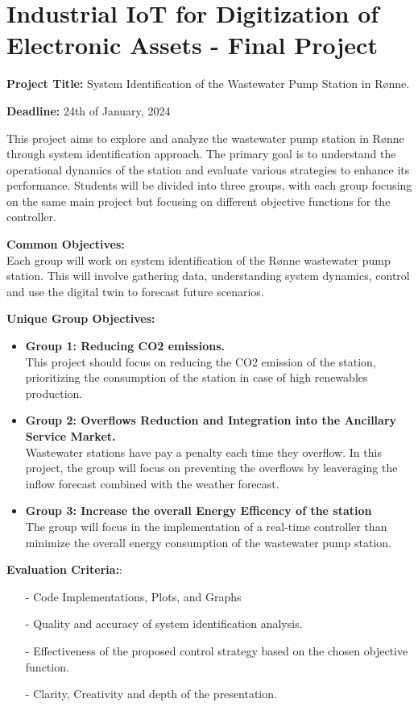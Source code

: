 \documentclass{dtuletter}
\begin{document}
\section*{\Large Industrial IoT for Digitization of Electronic Assets -
Final Project}

\vspace{2em}
\textbf{Project Title:} System Identification of the Wastewater Pump Station in Rønne.

\textbf{Deadline:} 24th of January, 2024


\vspace{1em}
This project aims to explore and analyze the wastewater pump station in Rønne through system identification approach.
The primary goal is to understand the operational dynamics of the station and evaluate various strategies to enhance its performance. 
Students will be divided into three groups, with each group focusing on the same main project but focusing on different objective functions for the controller.

\textbf{Common Objectives:} \\
Each group will work on system identification of the Rønne wastewater pump station.
This will involve gathering data, understanding system dynamics, control and use the digital twin to forecast future scenarios.

\textbf{Unique Group Objectives:} 
\begin{itemize}
	\item \textbf{Group 1: Reducing CO2 emissions.} \\
	This project should focus on reducing the CO2 emission of the station, prioritizing the consumption of the station in case of high renewables production. 
	\item \textbf{Group 2: Overflows Reduction and Integration into the Ancillary Service Market.} \\
	Wastewater stations have pay a penalty each time they overflow. In this project, the group will focus on preventing the overflows by leaveraging the inflow forecast combined with the weather forecast.
	\item \textbf{Group 3: Increase the overall Energy Efficency of the station} \\
	The group will focus in the implementation of a real-time controller than minimize the overall energy consumption of the wastewater pump station.

\end{itemize}

\textbf{Evaluation Criteria:}: \\
\begin{itemize}
	\item[-] Code Implementations, Plots, and Graphs
	\item[-] Quality and accuracy of system identification analysis.
	\item[-] Effectiveness of the proposed control strategy based on the chosen objective function. 
	\item[-] Clarity, Creativity and depth of the presentation.
\end{itemize}
\end{document}
